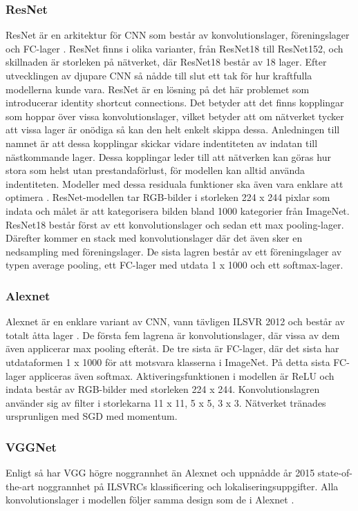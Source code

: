 \documentclass[]{kththesis}
\begin{document}
\subsubsection{ResNet}
ResNet är en arkitektur för CNN som består av konvolutionslager, föreningslager och FC-lager \parencite{he2016deep}. ResNet finns i olika varianter, från ResNet18 till ResNet152, och skillnaden är storleken på nätverket, där ResNet18 består av 18 lager. Efter utvecklingen av djupare CNN så nådde till slut ett tak för hur kraftfulla modellerna kunde vara. ResNet är en lösning på det här problemet som introducerar identity shortcut connections. Det betyder att det finns kopplingar som hoppar över vissa konvolutionslager, vilket betyder att om nätverket tycker att vissa lager är onödiga så kan den helt enkelt skippa dessa. Anledningen till namnet är att dessa kopplingar skickar vidare indentiteten av indatan till nästkommande lager. Dessa kopplingar leder till att nätverken kan göras hur stora som helst utan prestandaförlust, för modellen kan alltid använda indentiteten. Modeller med dessa residuala funktioner ska även vara enklare att optimera \parencite{he2016deep}. ResNet-modellen tar RGB-bilder i storleken 224 x 244 pixlar som indata och målet är att kategorisera bilden bland 1000 kategorier från ImageNet. ResNet18 består först av ett konvolutionslager och sedan ett max pooling-lager. Därefter kommer en stack med konvolutionslager där det även sker en nedsampling med föreningslager. De sista lagren består av ett föreningslager av typen average pooling, ett FC-lager med utdata 1 x 1000 och ett softmax-lager.

\subsubsection{Alexnet}
Alexnet är en enklare variant av CNN, vann tävligen ILSVR 2012 och består av totalt åtta lager \parencite{krizhevsky2012imagenet}. De första fem lagrena är konvolutionslager, där vissa av dem även applicerar max pooling efteråt. De tre sista är FC-lager, där det sista har utdataformen 1 x 1000 för att motsvara klasserna i ImageNet. På detta sista FC-lager appliceras även softmax. Aktiveringsfunktionen i modellen är ReLU och indata består av RGB-bilder med storleken 224 x 244. Konvolutionslagren använder sig av filter i storlekarna 11 x 11, 5 x 5, 3 x 3. Nätverket tränades ursprunligen med SGD med momentum.

\subsubsection{VGGNet}
Enligt \cite{simonyan2014very} så har VGG högre noggrannhet än Alexnet och uppnådde år 2015 state-of-the-art noggrannhet på ILSVRCs klassificering och lokaliseringsuppgifter. Alla konvolutionslager i modellen följer samma design som de i Alexnet \parencite{simonyan2014very}. 
\end{document}
